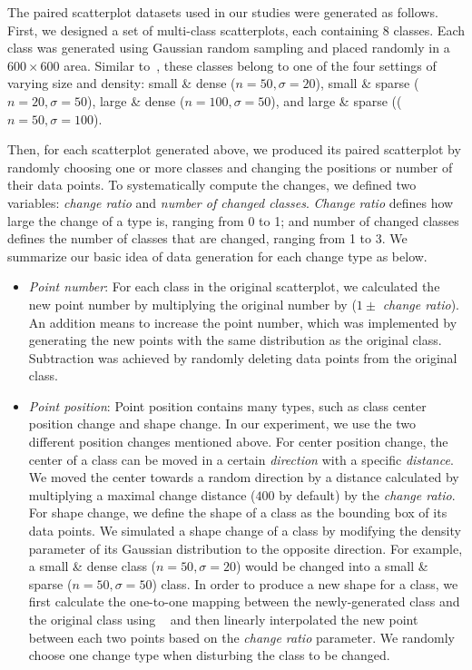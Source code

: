 \vspace{.3em}
The paired scatterplot datasets used in our studies were generated as follows.
First, we designed a set of multi-class scatterplots, each containing $8$ classes. Each class was generated using Gaussian random sampling and placed randomly in a $600 \times 600$ area.
Similar to~\cite{Lu21}, these classes belong to one of the four settings of varying size and density: small \& dense ($n=50, \sigma=20$), small \& sparse ($n=20, \sigma=50$),  large \& dense ($n=100, \sigma=50$), and large \& sparse (($n=50, \sigma=100$).

Then, for each scatterplot generated above, we produced its paired scatterplot by randomly choosing one or more classes and changing the positions or number of their data points.
To systematically compute the changes, we defined two variables: \emph{change ratio} and \emph{number of changed classes}.
\emph{Change ratio} defines how large the change of a type is, ranging from 0 to 1; and {number of changed classes} defines the number of classes that are changed, ranging from 1 to 3. We summarize our basic idea of data generation for each change type as below.
\begin{itemize}

     \item \emph{Point number}: For each class in the original scatterplot,  we calculated the new point number by multiplying the original number by ($1 \pm$ \emph{change ratio}). An addition means to increase the point number, which was implemented by generating the new points with the same distribution as the original class. Subtraction was achieved by randomly deleting data points from the original class.

     \item \emph{Point position}: Point position contains many types, such as class center position change and shape change. In our experiment, we use the two different position changes mentioned above. For center position change, the center of a class can be moved in a certain \emph{direction} with a specific \emph{distance}. We moved the center towards a random direction by a distance calculated by multiplying a maximal change distance ($400$ by default) by the \emph{change ratio}. For shape change, we define the shape of a class as the bounding box of its data points. We simulated a shape change of a class by modifying the density parameter of its Gaussian distribution to the opposite direction. For example, a small \& dense class ($n=50, \sigma=20$) would be changed into a small \& sparse ($n=50, \sigma=50$) class. In order to produce a new shape for a class, we first calculate the one-to-one mapping between the newly-generated class and the original class using ~\cite{kuhn1955hungarian} and then linearly interpolated the new point between each two points based on the \emph{change ratio} parameter. We randomly choose one change type when disturbing the class to be changed.
\end{itemize}
